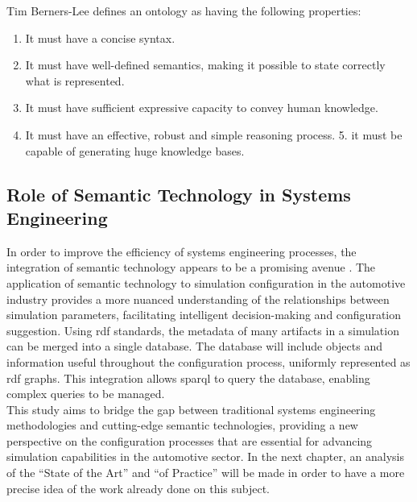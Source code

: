     Tim Berners-Lee \cite{kuck2004tim} defines an ontology as having the following properties: 
    \begin{enumerate}
        \item It must have a concise syntax.
        \item It must have well-defined semantics, making it possible to state correctly what is represented.
        \item It must have sufficient expressive capacity to convey human knowledge.
        \item It must have an effective, robust and simple reasoning process. 5. it must be capable of generating huge knowledge bases.
    \end{enumerate}


\subsection{Role of Semantic Technology in Systems Engineering}
In order to improve the efficiency of systems engineering processes, the integration of semantic technology appears to be a promising avenue \cite{hagedorn2020knowledge}. The application of semantic technology to simulation configuration in the automotive industry provides a more nuanced understanding of the relationships between simulation parameters, facilitating intelligent decision-making and configuration suggestion. Using \acrshort{rdf} standards, the metadata of many artifacts in a simulation can be merged into a single database. The database will include objects and information useful throughout the configuration process, uniformly represented as \acrshort{rdf} graphs. This integration allows \acrshort{sparql} to query the database, enabling complex queries to be managed.\\

This study aims to bridge the gap between traditional systems engineering methodologies and cutting-edge semantic technologies, providing a new perspective on the configuration processes that are essential for advancing simulation capabilities in the automotive sector. In the next chapter, an analysis of the “State of the Art” and “of Practice” will be made in order to have a more precise idea of the work already done on this subject.











